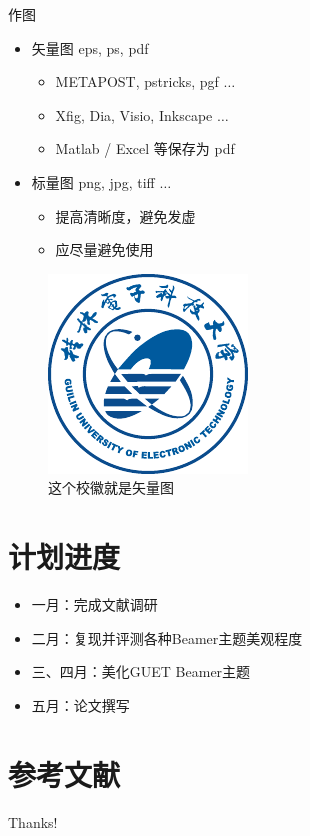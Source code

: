 \documentclass{beamer}
\begin{document}
\begin{frame}{作图}
    \begin{itemize}
        \item 矢量图 eps, ps, pdf
        \begin{itemize}
            \item METAPOST, pstricks, pgf $\ldots$
            \item Xfig, Dia, Visio, Inkscape $\ldots$
            \item Matlab / Excel 等保存为 pdf
        \end{itemize}
        \item 标量图 png, jpg, tiff $\ldots$
        \begin{itemize}
            \item 提高清晰度，避免发虚
            \item 应尽量避免使用
        \end{itemize}
    \end{itemize}
    \begin{figure}[htpb]
        \centering
        \includegraphics[width=0.2\linewidth]{Guet-logo.pdf}
        \caption{这个校徽就是矢量图}
    \end{figure}
\end{frame}


\section{计划进度}
\begin{frame}
    \begin{itemize}
        \item 一月：完成文献调研
        \item 二月：复现并评测各种Beamer主题美观程度
        \item 三、四月：美化GUET Beamer主题
        \item 五月：论文撰写
    \end{itemize}
\end{frame}


\section{参考文献}

\begin{frame}[allowframebreaks]
    
    
\end{frame}

\begin{frame}
    \begin{center}
        {\Huge\calligra Thanks!}
    \end{center}
\end{frame}
\end{document}
